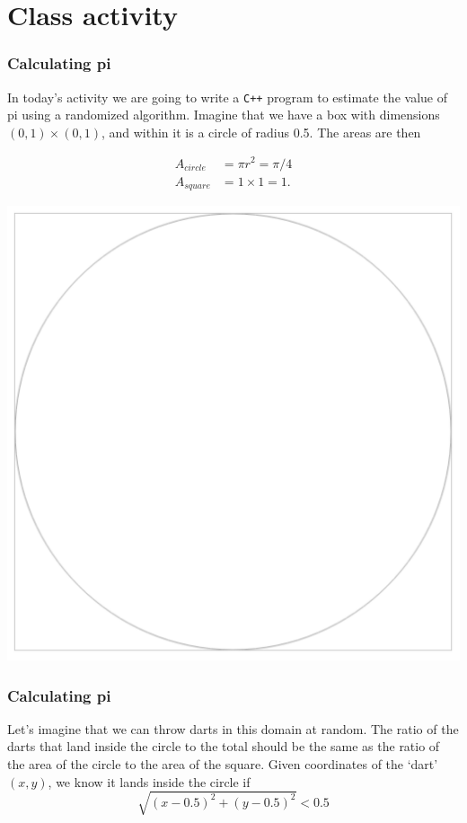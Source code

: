 \documentclass{if-beamer}
\begin{document}
\section{Class activity}

\begin{frame}
\frametitle{Calculating pi}
\vspace{0.5cm}
In today's activity we are going to write a \texttt{C++} program to
estimate the value of pi using a randomized algorithm. Imagine that we
have a box with dimensions $(0,1)\times(0,1)$, and within it is a circle of
radius 0.5. The areas are then\\
\vspace{1pt}
\begin{minipage}{0.5\textwidth}
	\begin{align*}
	A_{circle} & = \pi r^2 = \pi/4 \\
	A_{square} & = 1 \times 1 = 1.
	\end{align*}
\end{minipage}
\begin{minipage}{0.5\textwidth}
	\flushright
	\includegraphics[width=.7\textwidth]{figures/circle_box.png}
\end{minipage}
\end{frame}

\begin{frame}
\frametitle{Calculating pi}
Let's imagine that we can throw darts in this domain at random. The
ratio of the darts that land inside the circle to the total should be
the same as the ratio of the area of the circle to the area of the
square. Given coordinates of the `dart' $(x,y)$, we know it lands
inside the circle if
\begin{equation*}
\sqrt{(x-0.5)^2 + (y-0.5)^2} < 0.5
\end{equation*}
\end{frame}
\end{document}
